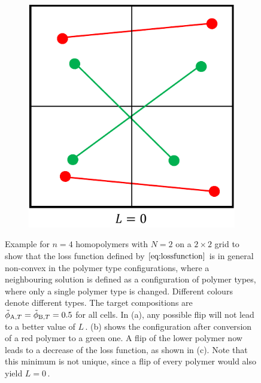 \documentclass[bachelor,       %
               twoside,        %
               BCOR10mm,       %
               ngerman, english %
               ]{GAUBM}
\begin{document}
\begin{figure}[h]
\begin{subfigure}[b]{0.3\textwidth}
      \caption{}
      \label{fig:loss-2}
  \end{subfigure}
      \hfill
  \begin{subfigure}[b]{0.3\textwidth}
      \centering
      \includegraphics[width=\textwidth]{figures/loss-3.pdf}
      \caption{}
      \label{fig:loss-3}
  \end{subfigure}
     \caption{Example for $n=4$ homopolymers with $N=2$ on a $2\times 2$ grid to show that the loss function defined by $\eqref{eq:lossfunction}$ is in general non-convex in the polymer type configurations, where a neighbouring solution is defined as a configuration of polymer types, where only a single polymer type is changed. Different colours denote different types. The target compositions are $\tilde\phi_{\text A,T}=\tilde\phi_{\text B,T}=0.5$ for all cells. In (a), any possible flip will not lead to a better value of $L\,.$ (b) shows the configuration after conversion of a red polymer to a green one. A flip of the lower polymer now leads to a decrease of the loss function, as shown in (c). Note that this minimum is not unique, since a flip of every polymer would also yield $L=0\,.$}
     \label{fig:loss}
\end{figure}





 


\end{document}
